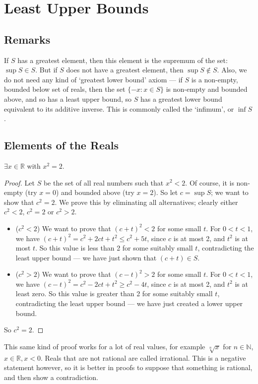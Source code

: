 \documentclass{article}
\begin{document}
	\section{Least Upper Bounds}
	\subsection{Remarks}
	If $S$ has a greatest element, then this element is the supremum of the set: $\sup S \in S$. But if $S$ does not have a greatest element, then $\sup S \notin S$. Also, we do not need any kind of `greatest lower bound' axiom --- if $S$ is a non-empty, bounded below set of reals, then the set $\{ -x: x \in S \}$ is non-empty and bounded above, and so has a least upper bound, so $S$ has a greatest lower bound equivalent to its additive inverse. This is commonly called the `infimum', or $\inf S$.

	\subsection{Elements of the Reals}
	\begin{theorem}
		$\exists x \in \mathbb R$ with $x^2 = 2$.
	\end{theorem}
	\begin{proof}
		Let $S$ be the set of all real numbers such that $x^2 < 2$. Of course, it is non-empty (try $x=0$) and bounded above (try $x=2$). So let $c = \sup S$; we want to show that $c^2 = 2$. We prove this by eliminating all alternatives; clearly either $c^2 < 2$, $c^2 = 2$ or $c^2 > 2$.
		\begin{itemize}
			\item ($c^2 < 2$) We want to prove that $(c+t)^2 < 2$ for some small $t$. For $0<t<1$, we have $(c+t)^2 = c^2 + 2ct + t^2 \leq c^2 + 5t$, since $c$ is at most 2, and $t^2$ is at most $t$. So this value is less than 2 for some suitably small $t$, contradicting the least upper bound --- we have just shown that $(c+t) \in S$.
			\item ($c^2 > 2$) We want to prove that $(c-t)^2 > 2$ for some small $t$. For $0<t<1$, we have $(c-t)^2 = c^2 - 2ct + t^2 \geq c^2 - 4t$, since $c$ is at most 2, and $t^2$ is at least zero. So this value is greater than 2 for some suitably small $t$, contradicting the least upper bound --- we have just created a lower upper bound.
		\end{itemize}
		So $c^2 = 2$.
	\end{proof}
	This same kind of proof works for a lot of real values, for example $\sqrt[n]{x}$ for $n \in \mathbb N$, $x\in \mathbb R, x < 0$. Reals that are not rational are called irrational. This is a negative statement however, so it is better in proofs to suppose that something is rational, and then show a contradiction.
\end{document}
